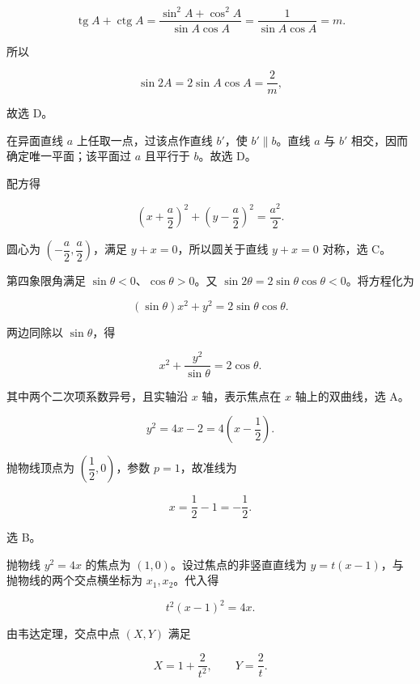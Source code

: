 \begin{answer}

\nopagebreak[4]
\[
\operatorname{tg}A+\operatorname{ctg}A
=\frac{\sin^2A+\cos^2A}{\sin A\cos A}
=\frac1{\sin A\cos A}=m.
\]

所以

\nopagebreak[4]
\[
\sin2A=2\sin A\cos A=\frac2m,
\]

故选 D。


在异面直线 $a$ 上任取一点，过该点作直线 $b'$，使 $b'\parallel b$。直线 $a$ 与 $b'$ 相交，因而确定唯一平面；该平面过 $a$ 且平行于 $b$。故选 D。


配方得

\nopagebreak[4]
\[
\left(x+\frac a2\right)^2+\left(y-\frac a2\right)^2=\frac{a^2}{2}.
\]

圆心为 $\left(-\dfrac a2,\dfrac a2\right)$，满足 $y+x=0$，所以圆关于直线 $y+x=0$ 对称，选 C。


第四象限角满足 $\sin\theta<0$、$\cos\theta>0$。又 $\sin2\theta=2\sin\theta\cos\theta<0$。将方程化为

\nopagebreak[4]
\[
(\sin\theta)x^2+y^2=2\sin\theta\cos\theta.
\]

两边同除以 $\sin\theta$，得

\nopagebreak[4]
\[
x^2+\frac{y^2}{\sin\theta}=2\cos\theta.
\]

其中两个二次项系数异号，且实轴沿 $x$ 轴，表示焦点在 $x$ 轴上的双曲线，选 A。


\nopagebreak[4]
\[
y^2=4x-2=4\left(x-\frac12\right).
\]

抛物线顶点为 $\left(\dfrac12,0\right)$，参数 $p=1$，故准线为

\nopagebreak[4]
\[
x=\frac12-1=-\frac12.
\]

选 B。


抛物线 $y^2=4x$ 的焦点为 $(1,0)$。设过焦点的非竖直直线为 $y=t(x-1)$，与抛物线的两个交点横坐标为 $x_1,x_2$。代入得

\nopagebreak[4]
\[
t^2(x-1)^2=4x.
\]

由韦达定理，交点中点 $(X,Y)$ 满足

\nopagebreak[4]
\[
X=1+\frac2{t^2},\qquad Y=\frac2t.
\]


\end{answer}
